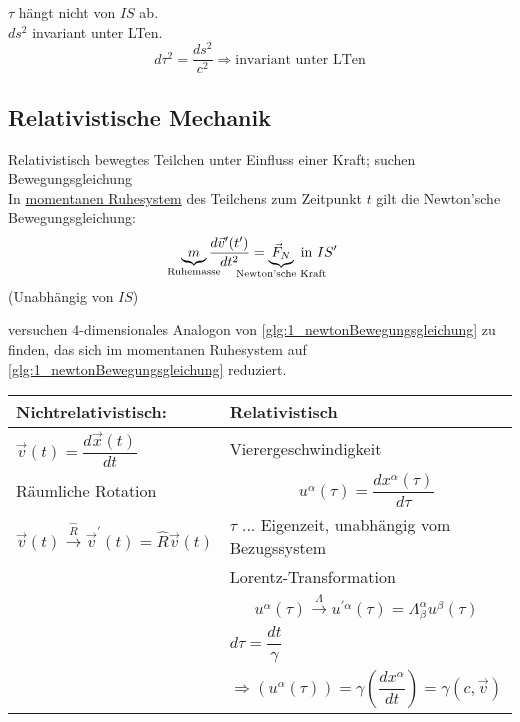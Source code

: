 \documentclass[a4paper, 11pt]{article}
\numberwithin{equation}{section}
\begin{document}
$\tau$ hängt nicht von $IS$ ab.\\
$ds^2$ invariant unter LTen.
\begin{equation}
d\tau^2 = \dfrac{ds^2}{c^2} \Rightarrow \text{invariant unter LTen}
\end{equation}


\subsection*{Relativistische Mechanik}
Relativistisch bewegtes Teilchen unter Einfluss einer Kraft; suchen Bewegungsgleichung\\
In \underline{momentanen Ruhesystem} des Teilchens zum Zeitpunkt $t$ gilt die Newton'sche Bewegungsgleichung:
\begin{equation}\label{glg:1_newtonBewegungsgleichung}
\underbrace{m}_{\mathclap{\text{Ruhemasse}}} \dfrac{d\vec{v}^\prime(t^\prime)}{dt^2} = \underbrace{\vec{F}_N}_{\mathclap{\text{Newton'sche Kraft}}} \text{ in } IS^\prime
\end{equation}
(Unabhängig von $IS$)


versuchen 4-dimensionales Analogon von \ref{glg:1_newtonBewegungsgleichung} zu finden, das sich im momentanen Ruhesystem auf \ref{glg:1_newtonBewegungsgleichung} reduziert.

\begin{tabular}{l | p{8cm}}
Nichtrelativistisch: & Relativistisch \\ \hline
$\vec{v}(t)= \dfrac{d\vec{x}(t)}{dt}$ & Vierergeschwindigkeit \\
Räumliche Rotation &  \begin{equation}
u^\alpha(\tau) = \dfrac{dx^\alpha(\tau)}{d\tau}
\end{equation} \\
$\vec{v}(t) \xrightarrow{\hat{R}} \vec{v}^\prime(t) = \hat{R}\vec{v}(t)$ & $\tau$ ... Eigenzeit, unabhängig vom Bezugssystem\\
& Lorentz-Transformation \\
& \begin{equation}
u^\alpha (\tau) \xrightarrow{\Lambda} u^{\prime\alpha}(\tau) = \Lambda^\alpha_\beta u^\beta(\tau)
\end{equation}\\
& $d\tau = \dfrac{dt}{\gamma}$\\
& $\Rightarrow \left(u^\alpha (\tau) \right) = \gamma \left(\dfrac{dx^\alpha}{dt} \right) = \gamma(c, \vec{v}) $
\end{tabular}
\end{document}
